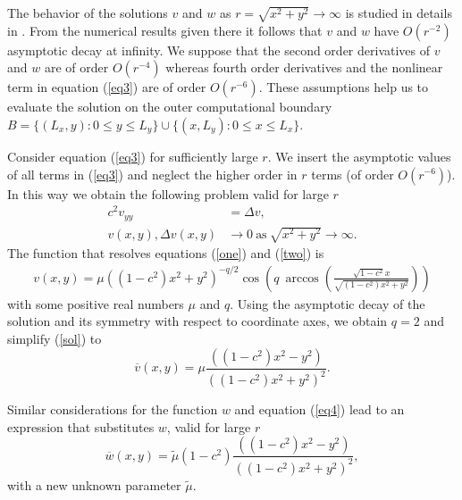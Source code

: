 \documentclass[preprint]{elsarticle}
\newcommand{\rf}[1]{(\ref{#1})}
\def\bar#1{{\overline{#1}}}
\begin{document}
The behavior of the solutions $v$ and $w$  as $r =\sqrt{x^2 +y^2} \rightarrow \infty$ is studied in details in \cite{Ch2011,Ch2012}. From the numerical results  given there it follows that   $v$ and $w$ have $O( r^{-2})$ asymptotic decay at infinity. We suppose that the  second order derivatives of $v$ and $w$  are of order $O(r^{-4})$  whereas  fourth order derivatives and the nonlinear term in equation \rf{eq3}   are of order $O(r^{-6})$.
These assumptions 
help us to evaluate the solution  on the outer computational boundary $B= \{(L_x,y):0\le y\le L_y\} \cup \{(x,L_y):0\le x\le L_x\} $. 

Consider equation \rf{eq3} for  sufficiently large $r$. 
 We insert the asymptotic values of all terms  in \rf{eq3} and  neglect the higher order in $r$ terms  (of order $O(r^{-6})$). In this way we obtain the  following  problem  valid for large $r$ 
\begin{subequations}\label{asympt}
\begin{align}
c^2 v_{yy} &= \Delta v, \label{one}
\\
v(x,y),  \Delta v(x,y) &\rightarrow 0~ \mbox{as}~ \sqrt{x^2 + y^2} \rightarrow \infty. \label{two}
\end{align}
\end{subequations}
The  function that resolves   equations \rf{one} and \rf{two} is
\begin{equation}\label{sol}
\begin{split}
v (x,y)=
 \mu ( (1-c^2)x^2+y^2 )^{-q/2}
\cos(q \: \arccos(\frac{\sqrt{1-c^2} x }{ \sqrt {(1-c^2)x^2 + y^2} }))
\end{split}
\end{equation}
with  some positive real numbers $\mu$ and $q$. 
Using the asymptotic decay of the solution and its symmetry with respect to coordinate axes,   we obtain  $q=2$ and simplify  \rf{sol}  to
\begin{equation}\label{bFunV}
\bar{v}(x,y) = \mu \frac{( (1-c^2)x^2-y^2 )}{((1-c^2)x^2 + y^2)^2 }.
\end{equation}

Similar considerations for the function $w$ and equation \rf{eq4} lead to an expression that substitutes $w$, valid for  large $r$ 
\begin{equation}\label{bFunW}
\bar{w}(x,y) =\tilde {\mu} (1-c^2) \frac{( (1-c^2)x^2-y^2 )}{((1-c^2)x^2 + y^2)^2 },
\end{equation}
with a new unknown parameter $\tilde {\mu}$. 
\end{document}
